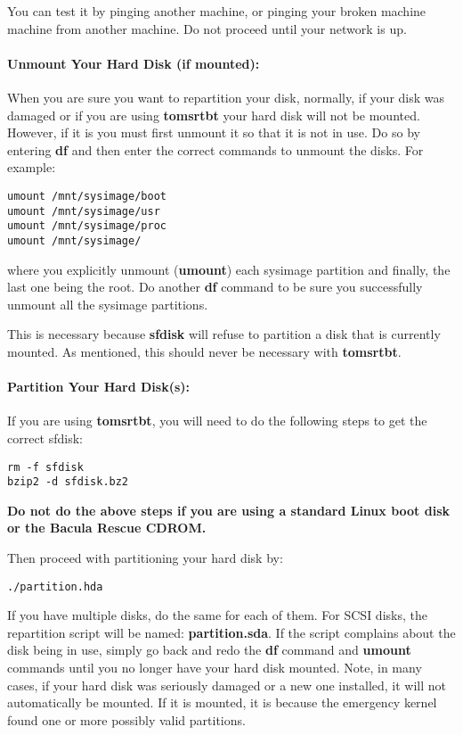 You can test it by pinging another machine, or pinging your broken machine
machine from another machine. Do not proceed until your network is up. 

\paragraph*{Unmount Your Hard Disk (if mounted):}

When you are sure you want to repartition your disk, normally, if your disk
was damaged or if you are using {\bf tomsrtbt} your hard disk will not be
mounted. However, if it is you must first unmount it so that it is not in use.
Do so by entering {\bf df} and then enter the correct commands to unmount the
disks. For example: 

\footnotesize
\begin{verbatim}
umount /mnt/sysimage/boot
umount /mnt/sysimage/usr
umount /mnt/sysimage/proc
umount /mnt/sysimage/
\end{verbatim}
\normalsize

where you explicitly unmount ({\bf umount}) each sysimage partition and
finally, the last one being the root. Do another {\bf df} command to be sure
you successfully unmount all the sysimage partitions. 

This is necessary because {\bf sfdisk} will refuse to partition a disk that is
currently mounted. As mentioned, this should never be necessary with {\bf
tomsrtbt}. 

\paragraph*{Partition Your Hard Disk(s):}

If you are using {\bf tomsrtbt}, you will need to do the following steps to
get the correct sfdisk: 

\footnotesize
\begin{verbatim}
rm -f sfdisk
bzip2 -d sfdisk.bz2
\end{verbatim}
\normalsize

{\bf Do not do the above steps if you are using a standard Linux boot disk or
the Bacula Rescue CDROM.} 

Then proceed with partitioning your hard disk by: 

\footnotesize
\begin{verbatim}
./partition.hda
\end{verbatim}
\normalsize

If you have multiple disks, do the same for each of them. For SCSI disks, the
repartition script will be named: {\bf partition.sda}. If the script complains
about the disk being in use, simply go back and redo the {\bf df} command and
{\bf umount} commands until you no longer have your hard disk mounted. Note,
in many cases, if your hard disk was seriously damaged or a new one installed,
it will not automatically be mounted. If it is mounted, it is because the
emergency kernel found one or more possibly valid partitions. 

